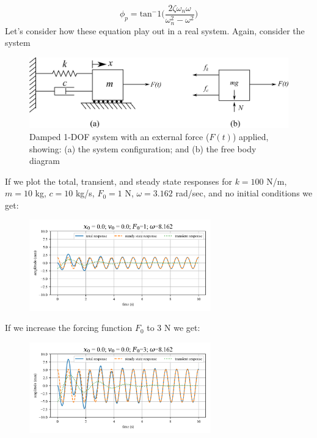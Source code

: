 \documentclass[12pt,letter]{article}
\numberwithin{ex}{section} %
\numberwithin{re}{section} %
\begin{document}
			\begin{equation}
				\phi_p = \text{tan}^-1\bigg(\frac{2\zeta \omega_n \omega}{\omega_n^2 - \omega^2}\bigg)
			\end{equation}							
			Let's consider how these equation play out in a real system. Again, consider the system
			\begin{figure}[H]
				\centering
				\includegraphics[]{../Figures/1-DOF-spring_dashpot_mass_horizontal_forced_FBD.png}
				\caption{Damped 1-DOF system with an external force ($F(t)$) applied, showing: (a) the system configuration; and (b) the free body diagram}
			\end{figure}			
			If we plot the total, transient, and steady state responses for $k=100$ N/m, $m=10$ kg,  $c=10$ kg/s, $F_0=1$ N, $\omega=3.162$ rad/sec, and no initial conditions we get:
			\begin{figure}[H]
				\centering
				\includegraphics[width=0.7\textwidth]{../Figures/example_1_1.png}
			\end{figure}			
			\noindent If we increase the forcing function $F_0$ to 3 N we get:
			\begin{figure}[H]
				\centering
				\includegraphics[width=0.7\textwidth]{../Figures/example_1_2.png}
			\end{figure}			
\end{document}

